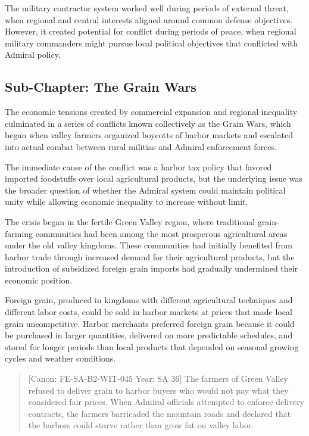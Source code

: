 The military contractor system worked well during periods of external
threat, when regional and central interests aligned around common
defense objectives. However, it created potential for conflict during
periods of peace, when regional military commanders might pursue local
political objectives that conflicted with Admiral policy.

\subsection{Sub-Chapter: The Grain
Wars}\label{sub-chapter-the-grain-wars}

The economic tensions created by commercial expansion and regional
inequality culminated in a series of conflicts known collectively as the
Grain Wars, which began when valley farmers organized boycotts of harbor
markets and escalated into actual combat between rural militias and
Admiral enforcement forces.

The immediate cause of the conflict was a harbor tax policy that favored
imported foodstuffs over local agricultural products, but the underlying
issue was the broader question of whether the Admiral system could
maintain political unity while allowing economic inequality to increase
without limit.

The crisis began in the fertile Green Valley region, where traditional
grain-farming communities had been among the most prosperous
agricultural areas under the old valley kingdoms. These communities had
initially benefited from harbor trade through increased demand for their
agricultural products, but the introduction of subsidized foreign grain
imports had gradually undermined their economic position.

Foreign grain, produced in kingdoms with different agricultural
techniques and different labor costs, could be sold in harbor markets at
prices that made local grain uncompetitive. Harbor merchants preferred
foreign grain because it could be purchased in larger quantities,
delivered on more predictable schedules, and stored for longer periods
than local products that depended on seasonal growing cycles and weather
conditions.

\begin{quote}
{[}Canon: FE-SA-B2-WIT-045 \textbar{} Year: SA 36{]} The farmers of
Green Valley refused to deliver grain to harbor buyers who would not pay
what they considered fair prices. When Admiral officials attempted to
enforce delivery contracts, the farmers barricaded the mountain roads
and declared that the harbors could starve rather than grow fat on
valley labor.
\end{quote}


